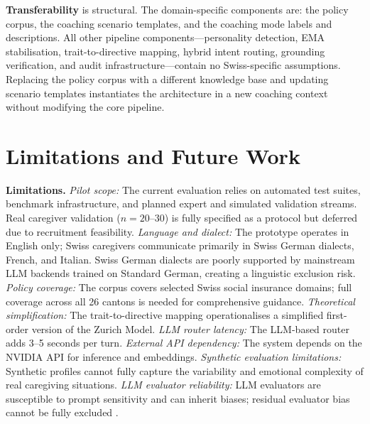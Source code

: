 \documentclass[10pt,a4paper]{report}
\begin{document}
\textbf{Transferability} is structural. The domain-specific components are: the policy corpus, the coaching scenario templates, and the coaching mode labels and descriptions. All other pipeline components---personality detection, EMA stabilisation, trait-to-directive mapping, hybrid intent routing, grounding verification, and audit infrastructure---contain no Swiss-specific assumptions. Replacing the policy corpus with a different knowledge base and updating scenario templates instantiates the architecture in a new coaching context without modifying the core pipeline.

\section{Limitations and Future Work}

\textbf{Limitations.} \emph{Pilot scope:} The current evaluation relies on automated test suites, benchmark infrastructure, and planned expert and simulated validation streams. Real caregiver validation ($n = 20$--30) is fully specified as a protocol but deferred due to recruitment feasibility. \emph{Language and dialect:} The prototype operates in English only; Swiss caregivers communicate primarily in Swiss German dialects, French, and Italian. Swiss German dialects are poorly supported by mainstream LLM backends trained on Standard German, creating a linguistic exclusion risk. \emph{Policy coverage:} The corpus covers selected Swiss social insurance domains; full coverage across all 26 cantons is needed for comprehensive guidance. \emph{Theoretical simplification:} The trait-to-directive mapping operationalises a simplified first-order version of the Zurich Model. \emph{LLM router latency:} The LLM-based router adds 3--5 seconds per turn. \emph{External API dependency:} The system depends on the NVIDIA API for inference and embeddings. \emph{Synthetic evaluation limitations:} Synthetic profiles cannot fully capture the variability and emotional complexity of real caregiving situations. \emph{LLM evaluator reliability:} LLM evaluators are susceptible to prompt sensitivity and can inherit biases; residual evaluator bias cannot be fully excluded \citep{Guo2023}.
\end{document}
